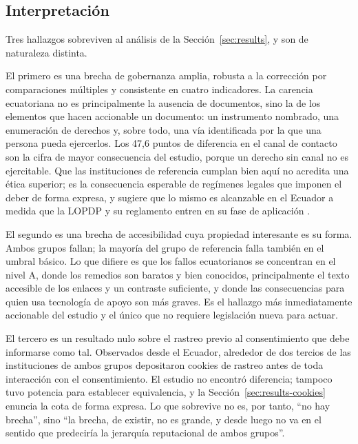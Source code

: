 \documentclass[pdflatex,sn-basic,Numbered]{sn-jnl}
\theoremstyle{thmstyleone}
\theoremstyle{thmstyletwo}
\theoremstyle{thmstylethree}
\begin{document}
\subsection{Interpretaci\'on}\label{sec:discussion-interp}

Tres hallazgos sobreviven al an\'alisis de la Secci\'on~\ref{sec:results}, y son de naturaleza distinta.

El primero es una brecha de gobernanza amplia, robusta a la correcci\'on por comparaciones m\'ultiples y consistente en cuatro indicadores. La carencia ecuatoriana no es principalmente la ausencia de documentos, sino la de los elementos que hacen accionable un documento: un instrumento nombrado, una enumeraci\'on de derechos y, sobre todo, una v\'ia identificada por la que una persona pueda ejercerlos. Los 47,6 puntos de diferencia en el canal de contacto son la cifra de mayor consecuencia del estudio, porque un derecho sin canal no es ejercitable. Que las instituciones de referencia cumplan bien aqu\'i no acredita una \'etica superior; es la consecuencia esperable de reg\'imenes legales que imponen el deber de forma expresa, y sugiere que lo mismo es alcanzable en el Ecuador a medida que la LOPDP y su reglamento entren en su fase de aplicaci\'on \citep{lopdp2021,reglamentolopdp2023}.

El segundo es una brecha de accesibilidad cuya propiedad interesante es su forma. Ambos grupos fallan; la mayor\'ia del grupo de referencia falla tambi\'en en el umbral b\'asico. Lo que difiere es que los fallos ecuatorianos se concentran en el nivel A, donde los remedios son baratos y bien conocidos, principalmente el texto accesible de los enlaces y un contraste suficiente, y donde las consecuencias para quien usa tecnolog\'ia de apoyo son m\'as graves. Es el hallazgo m\'as inmediatamente accionable del estudio y el \'unico que no requiere legislaci\'on nueva para actuar.

El tercero es un resultado nulo sobre el rastreo previo al consentimiento que debe informarse como tal. Observados desde el Ecuador, alrededor de dos tercios de las instituciones de ambos grupos depositaron cookies de rastreo antes de toda interacci\'on con el consentimiento. El estudio no encontr\'o diferencia; tampoco tuvo potencia para establecer equivalencia, y la Secci\'on~\ref{sec:results-cookies} enuncia la cota de forma expresa. Lo que sobrevive no es, por tanto, ``no hay brecha'', sino ``la brecha, de existir, no es grande, y desde luego no va en el sentido que predecir\'ia la jerarqu\'ia reputacional de ambos grupos''.
\end{document}

